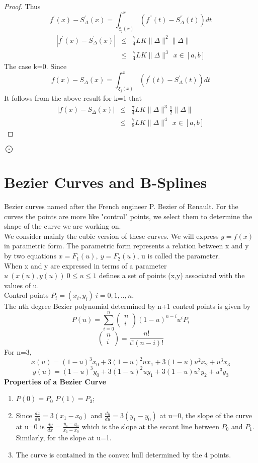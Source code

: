 \begin{proof}
Thus
\[
f^{'}(x)-S^{'}_{\Delta}(x) = \int_{\xi_j(x)}^{x}(f^{''}(t)-S^{''}_{\Delta}(t))dt
\]
\begin{eqnarray*}
|f^{'}(x) - S_{\Delta}^{'}(x)| & \leq & \frac{7}{4} L K \lVert \Delta\rVert ^2 \lVert \Delta\rVert \\
& \leq & \frac{7}{4}LK\lVert \Delta\rVert ^3  \ \ x \in [a,b]
\end{eqnarray*}
The case k=0. Since 
\[
f(x)-S_{\Delta}(x) = \int_{\xi_j(x)}^{x}(f^{'}(t)-S^{'}_{\Delta}(t))dt
\]
It follows from the above result for k=1 that 
\begin{eqnarray*}
|f(x) - S_{\Delta}(x)| & \leq & \frac{7}{4} L K \lVert \Delta\rVert ^3 \frac{1}{2}\lVert \Delta\rVert \\
& \leq & \frac{7}{8}LK\lVert \Delta\rVert ^4  \ \ x \in [a,b]
\end{eqnarray*}
\end{proof} $\bigodot$
\section{Bezier Curves and B-Splines}
Bezier curves named after the French engineer P. Bezier of Renault.
For the curves the points are more like "control" points, we select them to determine
the shape of the curve we are working on.\\
We consider mainly the cubic version of these curves. We will express $y=f(x)$ in parametric form.
The parametric form represents a relation between x and y by two equations
$x=F_1(u), \ y=F_2(u)$, u is called the parameter.\\
When x and y are expressed in terms of a parameter $u \  (x(u),y(u)) \ 0\leq u \leq 1$
defines a set of points (x,y) associated with the values of u.\\
Control points $P_i = (x_i,y_i) \ i=0,1,..,n$.\\
The nth degree Bezier polynomial determined by n+1 control points is given by
\[
P(u) = \sum^{n}_{i=0}
\left( \begin{array}{c}
      n \\
      i\end{array} \right)
(1-u)^{n-i}u^i P_i \]
\[
\left( \begin{array}{c}
      n \\
      i\end{array} \right)
= \frac{n!}{i!(n-i)!}
 \]
For n=3,
\[
x(u) = (1-u)^3x_0+3(1-u)^2ux_1+3(1-u)u^2x_2+u^3x_3
\]
\[
y(u) = (1-u)^3y_0+3(1-u)^2uy_1+3(1-u)u^2y_2+u^3y_3
\]
\textbf{Properties of a Bezier Curve}
\begin{enumerate}
\item
$P(0)=P_0$ \hspace{0.2 in} $P(1)=P_3$;
\item
Since $\frac{dx}{du}=3(x_1-x_0)$
and $\frac{dy}{du}=3(y_1-y_0)$ at u=0, the slope of the curve at u=0 is 
$\frac{dy}{dx}=\frac{y_1-y_0}{x_1-x_0}$ which  is the slope at the secant line 
between $P_0$ and $P_1$.  Similarly, for the slope at u=1.
\item
The curve is contained in the convex hull determined by the 4 points.
\end{enumerate}
